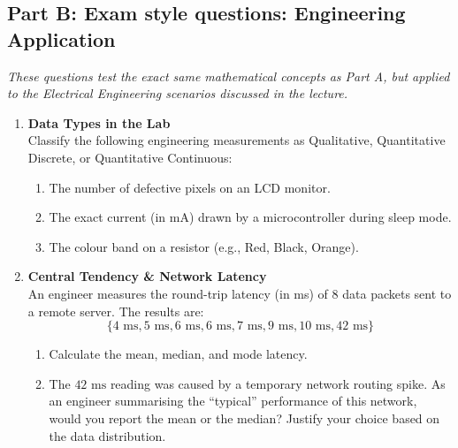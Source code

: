 \vspace{0.8cm}

\subsection*{Part B: Exam style questions: Engineering Application}
\textit{These questions test the exact same mathematical concepts as Part A, but applied to the Electrical Engineering scenarios discussed in the lecture.}

\begin{enumerate}[label=\textbf{Q\arabic*.}, leftmargin=*, start=4]

    \item \textbf{Data Types in the Lab} \\
    Classify the following engineering measurements as Qualitative, Quantitative Discrete, or Quantitative Continuous:
    \begin{enumerate}[label=\arabic*.]
        \item The number of defective pixels on an LCD monitor.
        \item The exact current (in mA) drawn by a microcontroller during sleep mode.
        \item The colour band on a resistor (e.g., Red, Black, Orange).
    \end{enumerate}
    \vspace{0.3cm}

    \item \textbf{Central Tendency \& Network Latency} \\
    An engineer measures the round-trip latency (in ms) of $8$ data packets sent to a remote server. The results are: 
    \[ \{ 4\text{ ms}, 5\text{ ms}, 6\text{ ms}, 6\text{ ms}, 7\text{ ms}, 9\text{ ms}, 10\text{ ms}, 42\text{ ms} \} \]
    \begin{enumerate}[label=\arabic*.]
        \item Calculate the mean, median, and mode latency.
        \item The $42\text{ ms}$ reading was caused by a temporary network routing spike. As an engineer summarising the ``typical'' performance of this network, would you report the mean or the median? Justify your choice based on the data distribution.
    \end{enumerate}
    \vspace{0.3cm}


\end{enumerate}
